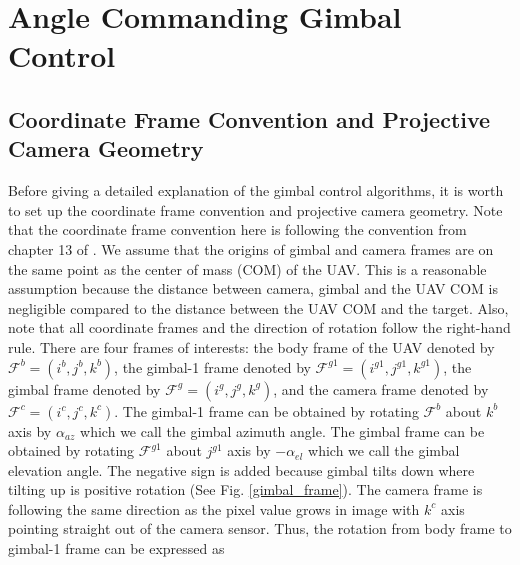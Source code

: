 \section{Angle Commanding Gimbal Control}
\subsection{Coordinate Frame Convention and Projective Camera Geometry}
Before giving a detailed explanation of the gimbal control algorithms, it is worth to set up the coordinate frame convention and projective camera geometry. Note that the coordinate frame convention here is following the convention from chapter 13 of \cite{beard2012small}. We assume that the origins of gimbal and camera frames are on the same point as the center of mass (COM) of the UAV. This is a reasonable assumption because the distance between camera, gimbal and the UAV COM is negligible compared to the distance between the UAV COM and the target. Also, note that all coordinate frames and the direction of rotation follow the right-hand rule. There are four frames of interests: the body frame of the UAV denoted by $\mathcal{F}^b=(i^{b}, j^{b}, k^{b})$, the gimbal-1 frame denoted by $\mathcal{F}^{g1}=(i^{g1}, j^{g1}, k^{g1})$, the gimbal frame denoted by $\mathcal{F}^{g}=(i^{g}, j^{g}, k^{g})$, and the camera frame denoted by $\mathcal{F}^{c}=(i^{c}, j^{c}, k^{c})$. The gimbal-1 frame can be obtained by rotating $\mathcal{F}^b$ about $k^{b}$ axis by $\alpha_{az}$ which we call the gimbal azimuth angle. The gimbal frame can be obtained by rotating $\mathcal{F}^{g1}$ about $j^{g1}$ axis by $-\alpha_{el}$ which we call the gimbal elevation angle. The negative sign is added because gimbal tilts down where tilting up is positive rotation (See Fig. \ref{gimbal_frame}). The camera frame is following the same direction as the pixel value grows in image with $k^{c}$ axis pointing straight out of the camera sensor. Thus, the rotation from body frame to gimbal-1 frame can be expressed as

